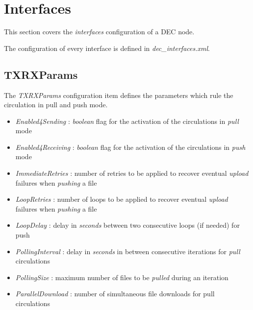 \documentclass[dec_sum_main.tex]{subfiles}
\begin{document}
\section{Interfaces}
 
This section covers the \textit{interfaces} configuration of a DEC node. 
\par
\noindent
The configuration of every interface is defined in \textit{dec\_interfaces.xml}.

\subsection{TXRXParams}
The \textit{TXRXParams} configuration item defines the parameters which rule the circulation in pull and push mode.
\par
\noindent
\begin{itemize}
	\item \textit{Enabled4Sending} : \textit{boolean} flag for the activation of the circulations in \textit{pull} mode
	\item \textit{Enabled4Receiving} : \textit{boolean} flag for the activation of the circulations in \textit{push} mode
	\item \textit{ImmediateRetries} : number of retries to be applied to recover eventual \textit{upload} failures when \textit{pushing} a file
	\item \textit{LoopRetries} : number of loops to be applied to recover eventual \textit{upload} failures when \textit{pushing} a file
	\item \textit{LoopDelay} : delay in \textit{seconds} between two consecutive loops (if needed) for push
	\item \textit{PollingInterval} : delay in \textit{seconds} in between consecutive iterations for \textit{pull} circulations
	\item \textit{PollingSize} : maximum number of files to be \textit{pulled} during an iteration   
	\item \textit{ParallelDownload} : number of simultaneous file downloads for pull circulations
\end{itemize}
\end{document}
